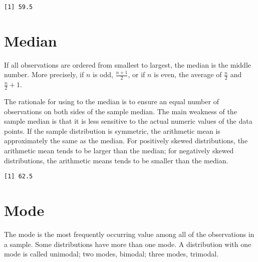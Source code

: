 \documentclass[]{book}
\newenvironment{Shaded}{\begin{snugshade}}{\end{snugshade}}
\newcommand{\KeywordTok}[1]{\textcolor[rgb]{0.13,0.29,0.53}{\textbf{#1}}}
\newcommand{\CommentTok}[1]{\textcolor[rgb]{0.56,0.35,0.01}{\textit{#1}}}
\newcommand{\OperatorTok}[1]{\textcolor[rgb]{0.81,0.36,0.00}{\textbf{#1}}}
\newcommand{\NormalTok}[1]{#1}
\theoremstyle{definition}
\theoremstyle{definition}
\theoremstyle{definition}
\theoremstyle{remark}
\begin{document}
\begin{verbatim}
[1] 59.5
\end{verbatim}

\section{Median}\label{median}

If all observations are ordered from smallest to largest, the median is
the middle number. More precisely, if \({n}\) is odd, \(\frac{n+1}{2}\),
or if \({n}\) is even, the average of \(\frac{n}{2}\) and
\(\frac{n}{2}+1\).

The rationale for using to the median is to ensure an equal number of
observations on both sides of the sample median. The main weakness of
the sample median is that it is less sensitive to the actual numeric
values of the data points. If the sample distribution is symmetric, the
arithmetic mean is approximately the same as the median. For positively
skewed distributions, the arithmetic mean tends to be larger than the
median; for negatively skewed distributions, the arithmetic means tends
to be smaller than the median.

\begin{Shaded}
\end{Shaded}

\begin{verbatim}
[1] 62.5
\end{verbatim}

\section{Mode}\label{mode}

The mode is the most frequently occurring value among all of the
observations in a sample. Some distributions have more than one mode. A
distribution with one mode is called unimodal; two modes, bimodal; three
modes, trimodal.

\begin{Shaded}
\end{Shaded}
\end{document}
